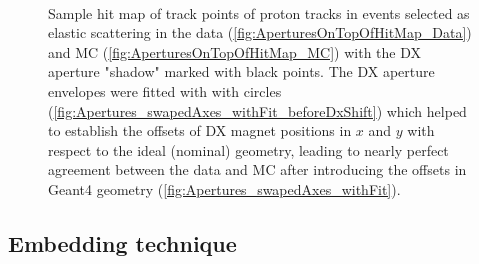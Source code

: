 \begin{figure}[hb!]
{\begin{subfigure}[b]{\linewidth}
		\end{subfigure}\\%
		\begin{subfigure}[b]{\linewidth}
		\end{subfigure}
	}%
\caption{Sample hit map of track points of proton tracks in events selected as elastic scattering in the data (\ref{fig:AperturesOnTopOfHitMap_Data}) and MC (\ref{fig:AperturesOnTopOfHitMap_MC}) with the DX aperture "shadow" marked with black points. The DX aperture envelopes were fitted with with circles (\ref{fig:Apertures_swapedAxes_withFit_beforeDxShift}) which helped to establish the offsets of DX magnet positions in $x$ and $y$ with respect to the ideal (nominal) geometry, leading to nearly perfect agreement between the data and MC after introducing the offsets in Geant4 geometry (\ref{fig:Apertures_swapedAxes_withFit}).}\label{fig:aperturesWithFit_Sample}%
\end{figure}


\subsection{Embedding technique}